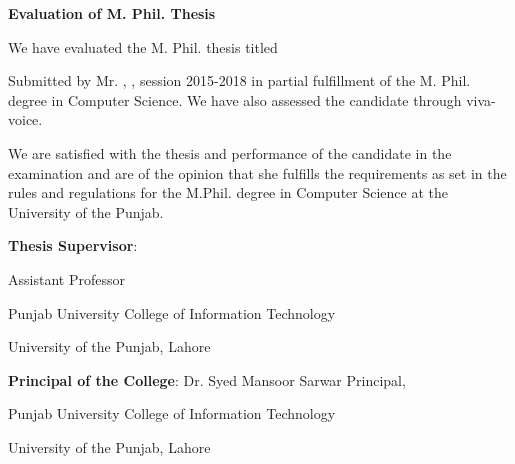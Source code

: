 
\begin{center}
    

\large{\textbf{Evaluation of M. Phil. Thesis}}
\end{center}

We have evaluated the M. Phil. thesis titled
\begin{center}
\textbf{ }
\end{center}

Submitted by Mr. \textbf{}, \textbf{}, session 2015-2018 in partial fulfillment of the M. Phil. degree in Computer Science. We have also assessed the candidate through viva-voice.

We are satisfied with the thesis and performance of the candidate in the examination and are of the opinion that she fulfills the requirements as set in the rules and regulations for the M.Phil. degree in Computer Science at the University of the Punjab.

\bigskip
\bigskip
 \textbf{Thesis Supervisor}:	\hfill {}

\hfill Assistant Professor

\hfill Punjab University College of Information Technology

\hfill University of the Punjab, Lahore



\bigskip

\bigskip
\textbf{Principal of the College}:  \hfill Dr. Syed Mansoor Sarwar
Principal, 

\hfill Punjab University College of Information Technology

\hfill University of the Punjab, Lahore
